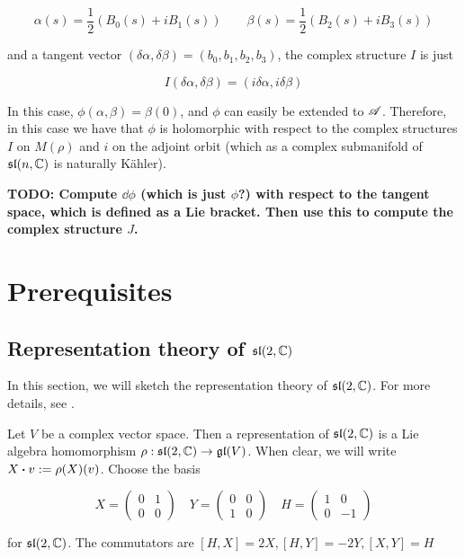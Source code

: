 \documentclass{report}
\renewcommand{\sl}{\mathfrak{sl}}
\begin{document}
\[\alpha(s) = \frac12(B_0(s) + iB_1(s)) \qquad \beta(s) = \frac12(B_2(s) + iB_3(s))\]

and a tangent vector \((\delta\alpha, \delta\beta) = (b_0, b_1, b_2, b_3)\), the complex structure \(I\) is just

\[I(\delta\alpha, \delta\beta) = (i\delta\alpha, i\delta\beta)\]

In this case, \(\phi(\alpha, \beta) = \beta(0)\), and \(\phi\) can easily be extended to \(\mathscr{A}\). Therefore, in this case we have that \(\phi\) is holomorphic with respect to the complex structures \(I\) on \(M(\rho)\) and \(i\) on the adjoint orbit (which as a complex submanifold of \(\sl(n, \C)\) is naturally K\"ahler).

\textbf{TODO: Compute \(\dd\phi\) (which is just \(\phi\)?) with respect to the tangent space, which is defined as a Lie bracket. Then use this to compute the complex structure \(J\).}

\appendix

\chapter{Prerequisites}

\section{Representation theory of \(\sl(2, \C)\)}

In this section, we will sketch the representation theory of \(\sl(2, \C)\). For more details, see \cite[Section 7]{humphreys}.

Let \(V\) be a complex vector space. Then a representation of \(\sl(2, \C)\) is a Lie algebra homomorphism \(\rho : \sl(2, \C) \to \gl(V)\). When clear, we will write \(X \vdot v := \rho(X)(v)\). Choose the basis

\[X = \begin{pmatrix}
    0 & 1 \\
    0 & 0
\end{pmatrix} \quad Y = \begin{pmatrix}
    0 & 0 \\
    1 & 0
\end{pmatrix} \quad H = \begin{pmatrix}
    1 & 0 \\
    0 & -1
\end{pmatrix}\]

for \(\sl(2, \C)\). The commutators are \([H, X] = 2X, [H, Y] = -2Y, [X,Y] = H\)
\end{document}
